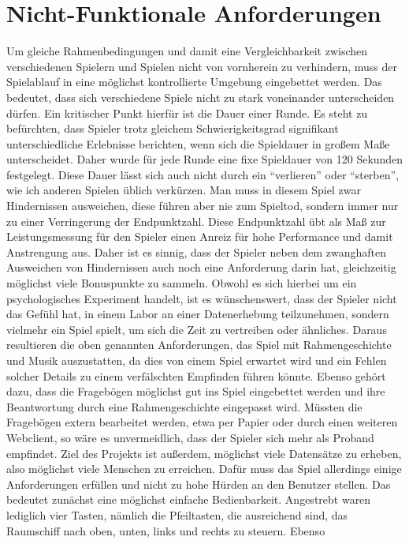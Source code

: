 \documentclass[a4paper,12pt]{scrartcl}
\begin{document}
\section{Nicht-Funktionale Anforderungen}
Um gleiche Rahmenbedingungen und damit eine Vergleichbarkeit zwischen verschiedenen
Spielern und Spielen nicht von vornherein zu verhindern, muss der Spielablauf in
eine möglichst kontrollierte Umgebung eingebettet werden. Das bedeutet, dass sich
verschiedene Spiele nicht zu stark voneinander unterscheiden dürfen. Ein kritischer Punkt
hierfür ist die Dauer einer Runde. Es steht zu befürchten, dass Spieler trotz gleichem
Schwierigkeitsgrad signifikant unterschiedliche Erlebnisse berichten, wenn sich die
Spieldauer in großem Maße unterscheidet. Daher wurde für jede Runde eine fixe Spieldauer
von 120 Sekunden festgelegt. Diese Dauer lässt sich auch nicht durch ein "`verlieren"'
oder "`sterben"', wie ich anderen Spielen üblich verkürzen. Man muss in diesem Spiel zwar
Hindernissen ausweichen, diese führen aber nie zum Spieltod, sondern immer nur zu einer
Verringerung der Endpunktzahl. Diese Endpunktzahl übt als Maß zur Leistungsmessung für
den Spieler einen Anreiz für hohe Performance und damit Anstrengung aus. Daher ist es
sinnig, dass der Spieler neben dem zwanghaften Ausweichen von Hindernissen auch noch
eine Anforderung darin hat, gleichzeitig möglichst viele Bonuspunkte zu sammeln.
Obwohl es sich hierbei um ein psychologisches Experiment handelt, ist es wünschenswert,
dass der Spieler nicht das Gefühl hat, in einem Labor an einer Datenerhebung
teilzunehmen, sondern vielmehr ein Spiel spielt, um sich die Zeit zu vertreiben oder
ähnliches. Daraus resultieren die oben genannten Anforderungen, das Spiel mit
Rahmengeschichte und Musik auszustatten, da dies von einem Spiel erwartet wird und
ein Fehlen solcher Details zu einem verfälschten Empfinden führen könnte. Ebenso
gehört dazu, dass die Fragebögen möglichst gut ins Spiel eingebettet werden und ihre
Beantwortung durch eine Rahmengeschichte eingepasst wird. Müssten die Fragebögen
extern bearbeitet werden, etwa per Papier oder durch einen weiteren Webclient, so wäre es
unvermeidlich, dass der Spieler sich mehr als Proband empfindet.
Ziel des Projekts ist außerdem, möglichst viele Datensätze zu erheben, also möglichst viele
Menschen zu erreichen. Dafür muss das Spiel allerdings einige Anforderungen erfüllen
und nicht zu hohe Hürden an den Benutzer stellen. Das bedeutet zunächst eine möglichst
einfache Bedienbarkeit. Angestrebt waren lediglich vier Tasten, nämlich die Pfeiltasten, die
ausreichend sind, das Raumschiff nach oben, unten, links und rechts zu steuern. Ebenso
\end{document}
